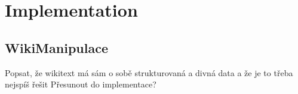 \section{Implementation}


\subsection{WikiManipulace}
Popsat, že wikitext má sám o sobě strukturovaná a divná data a že je to třeba nejspíš řešit Přesunout do implementace?

